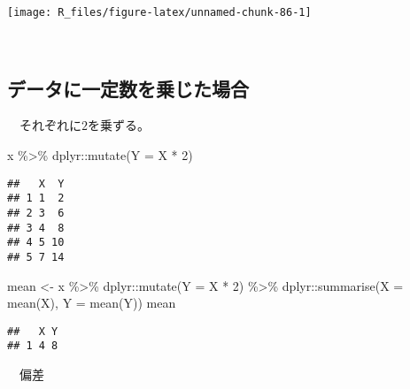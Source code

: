 \documentclass[
  12pt,
]{book}
\newenvironment{Shaded}{\begin{snugshade}}{\end{snugshade}}
\newcommand{\AttributeTok}[1]{\textcolor[rgb]{0.77,0.63,0.00}{#1}}
\newcommand{\DecValTok}[1]{\textcolor[rgb]{0.00,0.00,0.81}{#1}}
\newcommand{\FunctionTok}[1]{\textcolor[rgb]{0.00,0.00,0.00}{#1}}
\newcommand{\NormalTok}[1]{#1}
\newcommand{\OtherTok}[1]{\textcolor[rgb]{0.56,0.35,0.01}{#1}}
\newcommand{\SpecialCharTok}[1]{\textcolor[rgb]{0.00,0.00,0.00}{#1}}
\begin{document}
\begin{center}\texttt{[image: R\_files/figure-latex/unnamed-chunk-86-1]} \end{center}

　

\hypertarget{ux30c7ux30fcux30bfux306bux4e00ux5b9aux6570ux3092ux4e57ux3058ux305fux5834ux5408}{%
\subsection*{データに一定数を乗じた場合}\label{ux30c7ux30fcux30bfux306bux4e00ux5b9aux6570ux3092ux4e57ux3058ux305fux5834ux5408}}

　それぞれに\(2\)を乗ずる。

\begin{Shaded}
\begin{Highlighting}[]
\NormalTok{x }\SpecialCharTok{\%\textgreater{}\%} 
\NormalTok{  dplyr}\SpecialCharTok{::}\FunctionTok{mutate}\NormalTok{(}\AttributeTok{Y =}\NormalTok{ X }\SpecialCharTok{*} \DecValTok{2}\NormalTok{)}
\end{Highlighting}
\end{Shaded}

\begin{verbatim}
##   X  Y
## 1 1  2
## 2 3  6
## 3 4  8
## 4 5 10
## 5 7 14
\end{verbatim}

\begin{Shaded}
\begin{Highlighting}[]
\NormalTok{mean }\OtherTok{\textless{}{-}}\NormalTok{ x }\SpecialCharTok{\%\textgreater{}\%} 
\NormalTok{  dplyr}\SpecialCharTok{::}\FunctionTok{mutate}\NormalTok{(}\AttributeTok{Y =}\NormalTok{ X }\SpecialCharTok{*} \DecValTok{2}\NormalTok{) }\SpecialCharTok{\%\textgreater{}\%} 
\NormalTok{  dplyr}\SpecialCharTok{::}\FunctionTok{summarise}\NormalTok{(}\AttributeTok{X =} \FunctionTok{mean}\NormalTok{(X), }\AttributeTok{Y =} \FunctionTok{mean}\NormalTok{(Y))}
\NormalTok{mean}
\end{Highlighting}
\end{Shaded}

\begin{verbatim}
##   X Y
## 1 4 8
\end{verbatim}

　偏差

\begin{Shaded}
\end{Shaded}
\end{document}
